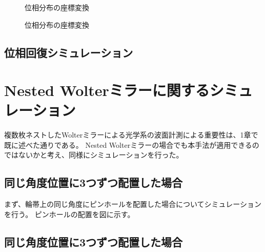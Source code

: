 \begin{figure}[!ht]
\centering
{}
\caption[]{位相分布の座標変換}
\label{fig:unwrap_transform}
\end{figure}

\begin{figure}[!ht]
\centering
{}
\caption[]{位相分布の座標変換}
\label{fig:unwrap_path}
\end{figure}

\subsection{位相回復シミュレーション}
\label{chap3_transverse_simulation_result}

\clearpage
\newpage

\section{Nested Wolterミラーに関するシミュレーション}
\label{chap3_nested_transverse_simulation}

複数枚ネストしたWolterミラーによる光学系の波面計測による重要性は、1章で既に述べた通りである。
Nested Wolterミラーの場合でも本手法が適用できるのではないかと考え、同様にシミュレーションを行った。

\subsection{同じ角度位置に3つずつ配置した場合}
\label{chap3_nested_transverse_same_angle}

まず、輪帯上の同じ角度にピンホールを配置した場合についてシミュレーションを行う。
ピンホールの配置を図に示す。


\subsection{同じ角度位置に3つずつ配置した場合}
\label{chap3_nested_transverse_different_angle}

